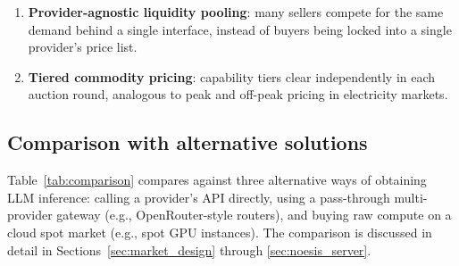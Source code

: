\begin{enumerate}
  \item \textbf{Provider-agnostic liquidity pooling}: many sellers compete
    for the same demand behind a single interface, instead of buyers being
    locked into a single provider's price list.

  \item \textbf{Tiered commodity pricing}: capability tiers clear
    independently in each auction round, analogous to peak and off-peak
    pricing in electricity markets.
\end{enumerate}

\subsection{Comparison with alternative solutions}
\label{sec:comparison_table}

Table~\ref{tab:comparison} compares \Noesis{} against three alternative ways
of obtaining LLM inference: calling a provider's API directly, using a
pass-through multi-provider gateway (e.g., OpenRouter-style routers), and
buying raw compute on a cloud spot market (e.g., spot GPU instances). The
comparison is discussed in detail in Sections~\ref{sec:market_design}
through \ref{sec:noesis_server}.

